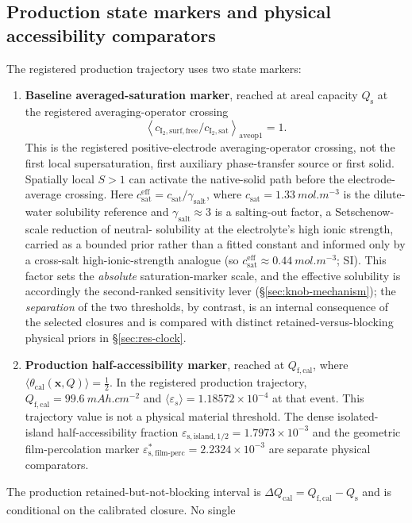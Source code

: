 \documentclass[11pt]{article}
\newcommand{\csat}{c_{\mathrm{sat}}}
\newcommand{\thetacal}{\theta_{\mathrm{cal}}}
\newcommand{\Qfcal}{Q_{\mathrm{f,cal}}}
\begin{document}
\subsection{Production state markers and physical accessibility comparators}
\label{sec:thresh}
The registered production trajectory uses two state markers:
\begin{enumerate}
\item \textbf{Baseline averaged-saturation marker}, reached at areal capacity $Q_{\mathrm s}$ at the
registered averaging-operator crossing
\[
\left\langle c_{\mathrm{I_2,surf,free}}/c_{\mathrm{I_2,sat}}\right\rangle_{\mathrm{aveop1}}=1.
\]
This is the registered positive-electrode averaging-operator crossing, not the first local supersaturation,
first auxiliary phase-transfer source or first solid. Spatially local $S>1$ can activate the native-solid path
before the electrode-average crossing. Here $\csat^{\mathrm{eff}}=\csat/\gamma_{\mathrm{salt}}$, where
$\csat=\SI{1.33}{mol.m^{-3}}$ is the dilute-water  solubility reference
\citep{Ramette1965} and $\gamma_{\mathrm{salt}}\approx3$ is a salting-out factor, a Setschenow-scale
reduction of neutral- solubility at the electrolyte's high ionic strength, carried as a bounded prior
rather than a fitted constant and informed only by a cross-salt high-ionic-strength analogue
\citep{Palmer1984} (so $\csat^{\mathrm{eff}}\!\approx\!\SI{0.44}{mol.m^{-3}}$; SI). This factor sets
the \emph{absolute} saturation-marker scale, and the effective solubility is accordingly the second-ranked sensitivity
lever (\S\ref{sec:knob-mechanism}); the \emph{separation} of the two thresholds, by contrast, is an internal
consequence of the selected closures and is compared with distinct retained-versus-blocking physical priors
in \S\ref{sec:res-clock}.
\item \textbf{Production half-accessibility marker}, reached at $\Qfcal$, where
$\langle\thetacal(\mathbf{x},Q)\rangle=\tfrac12$. In the registered production trajectory,
$\Qfcal=\SI{99.6}{mAh.cm^{-2}}$ and $\langle\varepsilon_s\rangle=1.18572\times10^{-4}$ at that event.
This trajectory value is not a physical material threshold. The dense isolated-island half-accessibility
fraction $\varepsilon_{\mathrm{s,island},1/2}=1.7973\times10^{-3}$ and the geometric film-percolation marker
$\varepsilon_{\mathrm{s,film\text{-}perc}}^*=2.2324\times10^{-3}$ are separate physical comparators.
\end{enumerate}
The production retained-but-not-blocking interval is
$\Delta Q_{\mathrm{cal}}=\Qfcal-Q_{\mathrm s}$ and is conditional on the calibrated closure. No single
\end{document}
